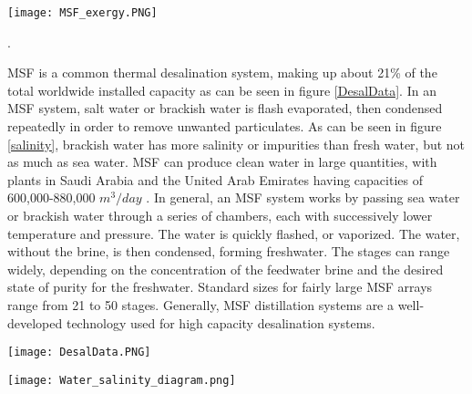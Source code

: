 \begin{figure*}[h!]
\centering
\texttt{[image: MSF\_exergy.PNG]}
\caption{\small \sl The Multi-Stage Flash exergy analysis diagram showing where exergy is lost in the system.  This exergy diagram was published in \cite{Kahraman2005}}.
\centering
\label{MSF_x}
\end{figure*}

MSF is a common thermal desalination system, making up about 21\% of the total worldwide installed capacity as can be seen in figure \ref{DesalData}. In an MSF system, salt water or brackish water is flash evaporated, then condensed repeatedly in order to remove unwanted particulates. As can be seen in figure \ref{salinity}, brackish water has more salinity or impurities than fresh water, but not as much as sea water. MSF can produce clean water in large quantities, with plants in Saudi Arabia and the United Arab Emirates having capacities of 600,000-880,000 $m^3/day$ \cite{El-Dessouky2016}. In general, an MSF system works by passing sea water or brackish water through a series of chambers, each with successively lower temperature and pressure.  The water is quickly flashed, or vaporized.  The water, without the brine, is then condensed, forming freshwater.  The stages can range widely, depending on the concentration of the feedwater brine and the desired state of purity for the freshwater. Standard sizes for fairly large MSF arrays range from 21 to 50 stages. Generally, MSF distillation systems are a well-developed technology used for high capacity desalination systems.
\begin{figure*}[h!]
\centering
\label{DesalData}
\texttt{[image: DesalData.PNG]}
\caption{\small \sl This pie chart from \cite{Khamis} shows the overall total installed capacities of each of the technologies used for desalination. The six technologies shown represent Reverse Osmosis (RO), Multistage Flash (MSF), Multiple-effect distillation (MED), Electrodialysis Reversal (ED/EDR), and Nanofiltration (NF)}
\centering
\label{DesalData}
\end{figure*}



\begin{figure*}[h!]
\centering
\texttt{[image: Water\_salinity\_diagram.png]}
\caption{\small \sl This figure displays the differences between different water qualities.  The groundwater in Arizona qualifies as brackish \cite{USBureauofReclamation2006}.  This image is from \cite{Summerlin}}
\label{salinity}
\end{figure*}


